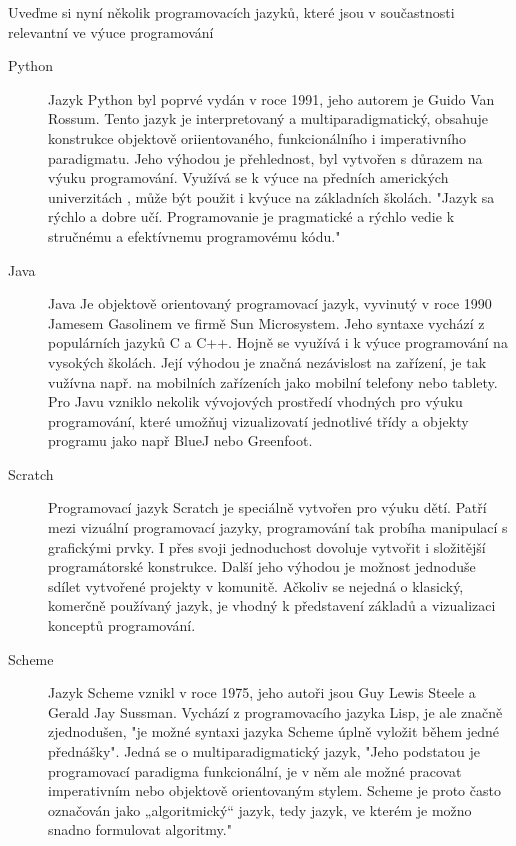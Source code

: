 \documentclass[FP,DP]{tulthesis}
\begin{document}
{{{{{{{\vspace{2mm}Uveďme si nyní několik programovacích jazyků, které jsou v součastnosti relevantní ve výuce programování
\begin{description}
\item [Python] Jazyk Python byl poprvé vydán v roce 1991, jeho autorem je Guido Van Rossum. Tento jazyk je interpretovaný a multiparadigmatický, obsahuje konstrukce objektově oriientovaného, funkcionálního i imperativního paradigmatu. Jeho výhodou je přehlednost, byl vytvořen s důrazem na výuku programování. Využívá se k výuce na předních amerických univerzitách , může být použit i kvýuce na základních školách. "Jazyk sa rýchlo a dobre učí. Programovanie je pragmatické a
rýchlo vedie k stručnému a efektívnemu programovému kódu." 
\item [Java] Java Je objektově orientovaný programovací jazyk, vyvinutý v roce 1990 Jamesem Gasolinem ve firmě Sun Microsystem. Jeho syntaxe vychází z populárních jazyků C a C++.   Hojně se využívá i k výuce programování na vysokých školách. Její výhodou je značná nezávislost na zařízení, je tak vužívna např. na mobilních zařízeních jako mobilní telefony nebo tablety. Pro Javu vzniklo nekolik vývojových prostředí vhodných pro výuku programování, které umožňuj vizualizovatí jednotlivé třídy a objekty programu jako např BlueJ nebo Greenfoot.  
\item [Scratch] Programovací jazyk Scratch je speciálně vytvořen pro výuku dětí. Patří mezi vizuální programovací jazyky, programování tak probíha manipulací s grafickými prvky. I přes svoji jednoduchost dovoluje vytvořit i složitější programátorské konstrukce. Další jeho výhodou je možnost jednoduše sdílet vytvořené projekty v komunitě. Ačkoliv se nejedná o klasický, komerčně používaný jazyk, je vhodný k představení základů a vizualizaci konceptů programování.
\item [Scheme] Jazyk Scheme vznikl v roce 1975, jeho autoři jsou Guy Lewis Steele a Gerald Jay Sussman. Vychází z programovacího jazyka Lisp, je ale značně zjednodušen,  "je možné syntaxi jazyka Scheme úplně vyložit během jedné přednášky". Jedná se o multiparadigmatický jazyk, "Jeho podstatou je programovací paradigma funkcionální, je v něm ale možné pracovat imperativním nebo objektově orientovaným stylem. Scheme je proto často označován jako „algoritmický“ jazyk, tedy jazyk, ve kterém je možno snadno formulovat algoritmy."
\end{description}

}}}}}}}
\end{document}
